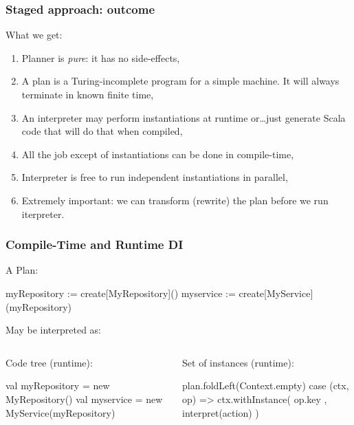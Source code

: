 \documentclass[usenames,dvipsnames]{beamer}
\begin{document}
\begin{frame}
\frametitle{Staged approach: outcome}
What we get:
\begin{enumerate}
\item Planner is \textit{pure}: it has no side-effects,
\item A plan is a Turing-incomplete program for a simple machine. It will always terminate in known finite time,
\item An interpreter may perform instantiations at runtime or\dots just generate Scala code that will do that when compiled,
\item All the job except of instantiations can be done in compile-time,
\item Interpreter is free to run independent instantiations in parallel,
\item Extremely important: we can transform (rewrite) the plan before we run iterpreter.
\end{enumerate}
\end{frame}

\begin{frame}[fragile]
\begin{center}
\frametitle{Compile-Time and Runtime DI}
A Plan:
\begin{textcode}
myRepository := create[MyRepository]()
myservice    := create[MyService](myRepository)
\end{textcode}

May be interpreted as:

\begin{columns}

\begin{column}[T]{0.5\textwidth}
   \setlength{\topsep}{0pt}
   \setlength{\partopsep}{0pt}
Code tree (runtime):
\begin{scalacode}
val myRepository = 
    new MyRepository()
val myservice = 
    new MyService(myRepository)
\end{scalacode}
\end{column}

\begin{column}[T]{0.5\textwidth}
Set of instances (runtime):
\begin{scalacode}
plan.foldLeft(Context.empty) {
case (ctx, op) =>
    ctx.withInstance(
        op.key
        , interpret(action)
    )
}
\end{scalacode}
\end{column}

\end{columns}
\end{center}
\end{frame}
\end{document}
